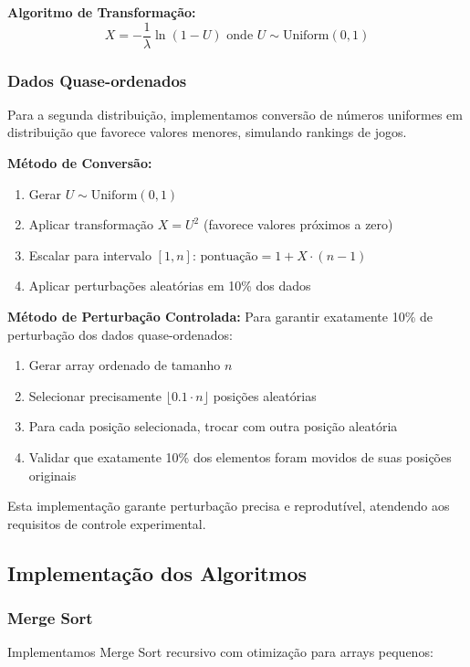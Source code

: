 \documentclass[conference]{IEEEtran}
\begin{document}
\textbf{Algoritmo de Transformação:}
\begin{equation}
X = -\frac{1}{\lambda} \ln(1-U) \text{ onde } U \sim \text{Uniform}(0,1)
\end{equation}

\subsubsection{Dados Quase-ordenados}
Para a segunda distribuição, implementamos conversão de números uniformes em distribuição que favorece valores menores, simulando rankings de jogos.

\textbf{Método de Conversão:}
\begin{enumerate}
\item Gerar $U \sim \text{Uniform}(0,1)$
\item Aplicar transformação $X = U^2$ (favorece valores próximos a zero)
\item Escalar para intervalo $[1, n]$: $\text{pontuação} = 1 + X \cdot (n-1)$
\item Aplicar perturbações aleatórias em 10\% dos dados
\end{enumerate}

\textbf{Método de Perturbação Controlada:}
Para garantir exatamente 10\% de perturbação dos dados quase-ordenados:
\begin{enumerate}
\item Gerar array ordenado de tamanho $n$
\item Selecionar precisamente $\lfloor 0.1 \cdot n \rfloor$ posições aleatórias
\item Para cada posição selecionada, trocar com outra posição aleatória
\item Validar que exatamente 10\% dos elementos foram movidos de suas posições originais
\end{enumerate}

Esta implementação garante perturbação precisa e reprodutível, atendendo aos requisitos de controle experimental.

\subsection{Implementação dos Algoritmos}

\subsubsection{Merge Sort}
Implementamos Merge Sort recursivo com otimização para arrays pequenos:
\end{document}
